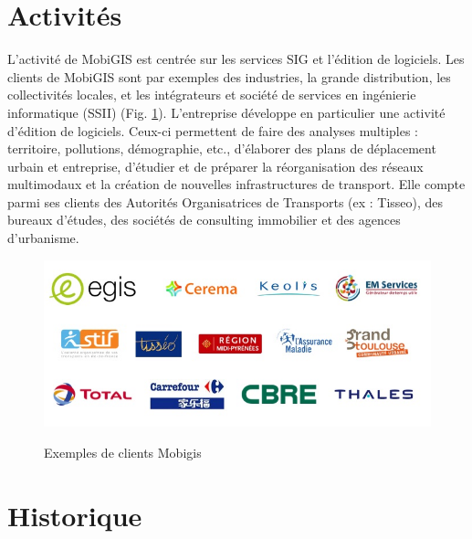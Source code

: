 \pagebreak

\section{Activités}

L'activité de MobiGIS est centrée sur les services SIG et l'édition de logiciels. Les clients de MobiGIS sont par exemples des industries, la grande distribution, les collectivités locales, et les intégrateurs et société de services en ingénierie informatique (SSII) (Fig. \ref{ClientsMobigis}). L'entreprise développe en particulier une activité d'édition de logiciels. Ceux-ci permettent de faire des analyses multiples : territoire, pollutions, démographie, etc., d'élaborer des plans de déplacement urbain et entreprise, d'étudier et de préparer la réorganisation des réseaux multimodaux et la création de nouvelles infrastructures de transport. Elle compte parmi ses clients des Autorités Organisatrices de Transports (ex : Tisseo), des bureaux d'études, des sociétés de consulting immobilier et des agences d'urbanisme.\\

\begin{center}
\begin{figure}[h] \centering
\includegraphics[width=14cm]{images/fig2_referencesMobigis.JPG}\\
\caption{\label{ClientsMobigis} Exemples de clients Mobigis}
\end{figure}
\end{center}

\section{Historique}

